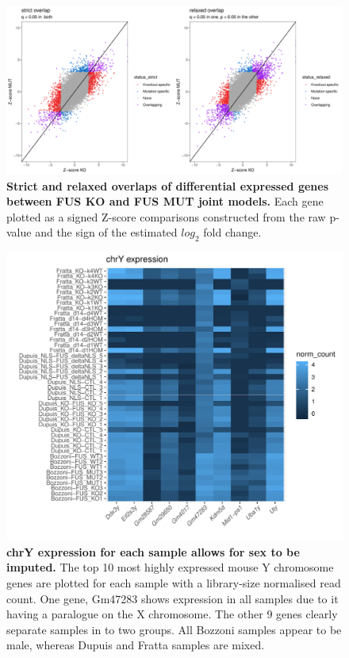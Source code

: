 \begin{figure}[h]
	\centering
	\includegraphics[width=\textwidth]{Figures/06_fus_meta/overlap_type_z_score_plot.pdf}
	\caption[Strict and relaxed overlaps of differential expressed genes]{
		\textbf{Strict and relaxed overlaps of differential expressed genes between FUS KO and FUS MUT joint models.}
			Each gene plotted as a signed Z-score comparisons constructed from the raw p-value and the sign of the estimated $log_2$ fold change.
}
	\label{fig:fus_zscore_overlap}
\end{figure}


\begin{figure}
	\centering
	\includegraphics[width=\textwidth]{Figures/06_fus_meta/sex_heatmap.pdf}
	\caption[chrY expression for each sample allows for sex to be imputed]{
		\textbf{chrY expression for each sample allows for sex to be imputed.} 
	The top 10 most highly expressed mouse Y chromosome genes are plotted for each sample with a library-size normalised read count.
	One gene, Gm47283 shows expression in all samples due to it having a paralogue on the X chromosome. 
	The other 9 genes clearly separate samples in to two groups. 
	All Bozzoni samples appear to be male, whereas Dupuis and Fratta samples are mixed.
}
	
	\label{fig:fus_sex_heatmap}
\end{figure}

